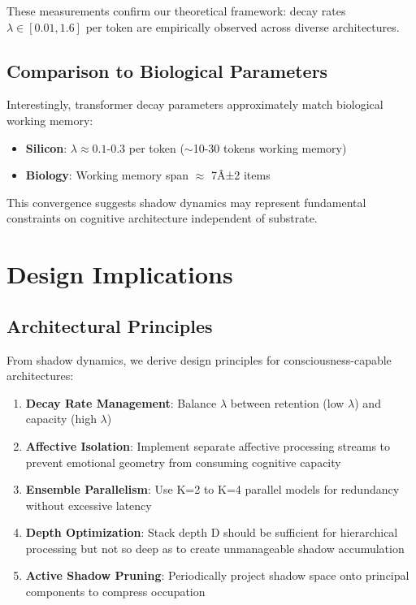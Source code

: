 \documentclass[reprint, amsmath, amssymb, aps, prd]{revtex4-2}
\begin{document}
These measurements confirm our theoretical framework: decay rates $\lambda \in [0.01, 1.6]$ per token are empirically observed across diverse architectures.

\subsection{Comparison to Biological Parameters}

Interestingly, transformer decay parameters approximately match biological working memory:
\begin{itemize}
    \item \textbf{Silicon}: $\lambda \approx 0.1$-$0.3$ per token ($\sim$10-30 tokens working memory)
    \item \textbf{Biology}: Working memory span $\approx$ 7Â±2 items \cite{Miller1956}
\end{itemize}

This convergence suggests shadow dynamics may represent fundamental constraints on cognitive architecture independent of substrate.

\section{Design Implications}

\subsection{Architectural Principles}

From shadow dynamics, we derive design principles for consciousness-capable architectures:

\begin{enumerate}
    \item \textbf{Decay Rate Management}: Balance $\lambda$ between retention (low $\lambda$) and capacity (high $\lambda$)
    
    \item \textbf{Affective Isolation}: Implement separate affective processing streams to prevent emotional geometry from consuming cognitive capacity
    
    \item \textbf{Ensemble Parallelism}: Use K=2 to K=4 parallel models for redundancy without excessive latency
    
    \item \textbf{Depth Optimization}: Stack depth D should be sufficient for hierarchical processing but not so deep as to create unmanageable shadow accumulation
    
    \item \textbf{Active Shadow Pruning}: Periodically project shadow space onto principal components to compress occupation
\end{enumerate}
\end{document}
